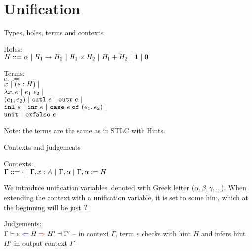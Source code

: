 \documentclass{beamer}
\begin{document}
\section{Unification}

\newcommand{\extendunif}[2]{#1, #2}
\newcommand{\extendunifdef}[3]{#1, #2 := #3}

\newcommand{\fulluniftyping}[5]{#1 \vdash #2 \mathcolor{blue}{\Leftarrow} #3 \mathcolor{red}{\Rightarrow} #4 \dashv #5}
\newcommand{\uniftyping}[3]{\fulluniftyping{\Gamma}{#1}{#2}{#3}{\Gamma'}}
\newcommand{\shortuniftyping}[3]{#1 \mathcolor{blue}{\Leftarrow} #2 \mathcolor{red}{\Rightarrow} #3}

\begin{frame}{Types, holes, terms and contexts}

Holes: \\
$H ::= \alpha \ |\  H_1 \to H_2 \ |\  H_1 \times H_2 \ |\  H_1 + H_2 \ |\  \textbf{1} \ |\  \textbf{0}$

\vspace{2em}

Terms: \\
$e ::=$ \\
\qquad $x \ |\  (e : H) \ |\  $ \\
\qquad $\lambda x.\, e \ |\  e_1\ e_2 \ |\ $ \\
\qquad $(e_1, e_2) \ |\  \texttt{outl}\ e \ |\  \texttt{outr}\ e \ |\ $ \\
\qquad $\texttt{inl}\ e \ |\  \texttt{inr}\ e \ |\  \texttt{case}\ e\ \texttt{of}\ (e_1, e_2) \ |\ $ \\
\qquad $\texttt{unit} \ |\  \texttt{exfalso}\ e$

\vspace{2em}

Note: the terms are the same as in STLC with Hints.

\end{frame}

\begin{frame}{Contexts and judgements}

Contexts: \\
$\Gamma ::= \emptytypingctx \pipe \extend{\Gamma}{x}{A} \pipe \extendunif{\Gamma}{\alpha} \pipe \extendunifdef{\Gamma}{\alpha}{H}$

\vspace{2em}

We introduce unification variables, denoted with Greek letter ($\alpha, \beta, \gamma, \dots$). When extending the context with a unification variable, it is set to some hint, which at the beginning will be just $\textbf{?}$.

\vspace{2em}

Judgements: \\
$\fulluniftyping{\Gamma}{e}{H}{H'}{\Gamma'}$ -- in context $\Gamma$, term $e$ checks with hint $H$ and infers hint $H'$ in output context $\Gamma'$

\end{frame}
\end{document}
